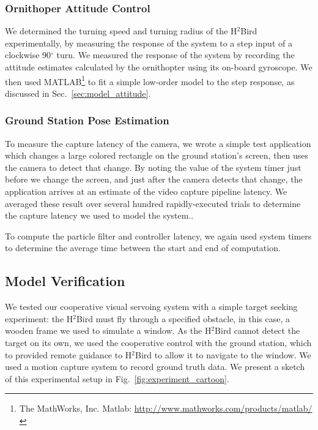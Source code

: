 \documentclass{aamas2013}
\begin{document}
\subsubsection{Ornithoper Attitude Control}

We determined the turning speed and turning radius of the H$^2$Bird
experimentally, by measuring the response of the system to a step input of a
clockwise 90$^{\circ}$ turn. We measured the response of the system by recording
the attitude estimates calculated by the ornithopter using its on-board
gyroscope. We then used
MATLAB\footnote{The MathWorks, Inc. Matlab:
\href{http://www.mathworks.com/products/matlab/}
     {http://www.mathworks.com/products/matlab/}} to fit a
simple low-order model to the step response, as discussed in Sec.~\ref{sec:model_attitude}.

\subsubsection{Ground Station Pose Estimation}

To measure the capture latency of the camera, we wrote a simple test 
application which changes a large colored rectangle on the ground station's screen, then uses the camera to detect that change. By noting the value of the system timer just before we change the screen, and just after the camera detects that change, the application arrives at an estimate of the video capture pipeline latency. We averaged these result over several hundred rapidly-executed trials to determine the capture latency we used to model the system..

To compute the particle filter and controller latency, we again used system timers to determine the
average time between the start and end of computation.

\subsection{Model Verification}

We tested our cooperative visual servoing system with a simple target seeking
experiment: the H$^2$Bird must fly through a specified obstacle, in this case,
a wooden frame we used to simulate a window. As the H$^2$Bird cannot detect the
target on its own, we used the cooperative control with the ground station, which to provided remote guidance to H$^2$Bird to allow it to navigate to the window.
We used a motion capture system to record 
ground truth data. We present a sketch of this experimental setup in
Fig.~\ref{fig:experiment_cartoon}.
\end{document}

